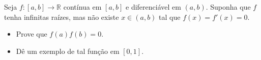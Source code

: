 Seja \(f \colon  \left[ a, b\right]\to\mathbb{R}\) contínua em \(\left[ a, b\right]\) e diferenciável em \(\left( a, b\right)\). Suponha que \(f\) tenha infinitas raízes, mas não existe \(x\in \left( a, b\right)\) tal que \(f(x)=f'(x)=0\).
\begin{itemize}
\item[(a)] Prove que \(f(a)f(b)=0\).
\item[(b)] Dê um exemplo de tal função em \(\left[ 0, 1\right]\).
\end{itemize}
